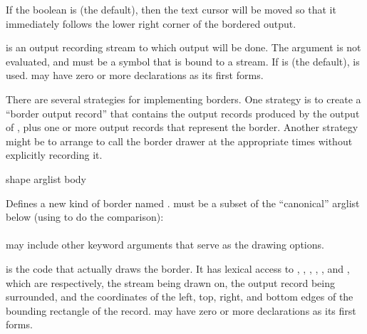 If the boolean  is  (the default), then the text
cursor will be moved so that it immediately follows the lower right corner of
the bordered output.

 is an output recording stream to which output will be done.
The  argument is not evaluated, and must be a symbol that is
bound to a stream.  If  is  (the default),
 is used.   may have zero or more
declarations as its first forms.

There are several strategies for implementing borders.  One strategy is to
create a ``border output record'' that contains the output records produced by
the output of , plus one or more output records that represent the
border.  Another strategy might be to arrange to call the border drawer at the
appropriate times without explicitly recording it.


 {shape arglist \body body}

Defines a new kind of border named .   must be a subset
of the ``canonical'' arglist below (using  to do the
comparison):
\\
\\

 may include other keyword arguments that serve as the drawing options.

 is the code that actually draws the border.  It has lexical access to
, , , , , and ,
which are respectively, the stream being drawn on, the output record being
surrounded, and the coordinates of the left, top, right, and bottom edges of the
bounding rectangle of the record.   may have zero or more declarations
as its first forms.
